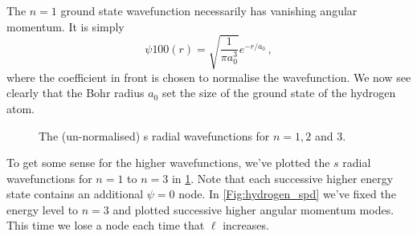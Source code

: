 \documentclass{article}
\theoremstyle{plain}\theoremheaderfont{\normalfont\itshape}\theorembodyfont{\rmfamily}\theoremseparator{.}\newtheorem*{rem}{Remark}\newtheorem*{ex}{Example}\newtheorem*{proof}{Proof}\newtheorem*{altp}{Alternative proof}
\theoremstyle{plain}\theoremheaderfont{\normalfont\bfseries}\theorembodyfont{\rmfamily}\theoremseparator{.}\newtheorem{thm}{Theorem}[section]\newtheorem{lem}[thm]{Lemma}\newtheorem{prop}[thm]{Proposition}\newtheorem*{cor}{Corollary}\newtheorem{defn}[thm]{Definition}\newtheorem{clm}[thm]{Claim}\newtheorem{clminproof}{Claim}
\theoremstyle{break}\theoremheaderfont{\normalfont\itshape}\theorembodyfont{\rmfamily}\theoremseparator{.\medskip}\newtheorem*{proofskip}{Proof}\newtheorem*{exs}{Examples}\newtheorem*{rems}{Remarks}
\theoremstyle{break}\theoremheaderfont{\normalfont\bfseries}\theorembodyfont{\rmfamily}\theoremseparator{.\medskip}\newtheorem{lemskip}[thm]{Lemma}\newtheorem{defnskip}[thm]{Definition}\newtheorem{propskip}[thm]{Proposition}\newtheorem{thmskip}[thm]{Theorem}
\numberwithin{equation}{section}
\begin{document}
    The \(n=1\) ground state wavefunction necessarily has vanishing angular momentum. It is simply
   \begin{equation}
        \psi{100}(r)=\sqrt{\frac{1}{\pi a_0^3}}e^{-r/a_0}\,,
    \end{equation}
    where the coefficient in front is chosen to normalise the wavefunction. We now see clearly that the Bohr radius \(a_0\) set the size of the ground state of the hydrogen atom.

    \begin{figure}
        \centering
        \caption{The (un-normalised) s radial wavefunctions for \(n= 1,2\) and \(3\).}
        \label{Fig:hydrogen_s}
    \end{figure}

    To get some sense for the higher wavefunctions, we've plotted the \(s\) radial wavefunctions for \(n=1\) to \(n=3\) in \cref{Fig:hydrogen_s}. Note that each successive higher energy state contains an additional \(\psi=0\) node. In \cref{Fig:hydrogen_spd} we've fixed the energy level to \(n=3\) and plotted successive higher angular momentum modes. This time we lose a node each time that \(\ell\) increases.
\end{document}
